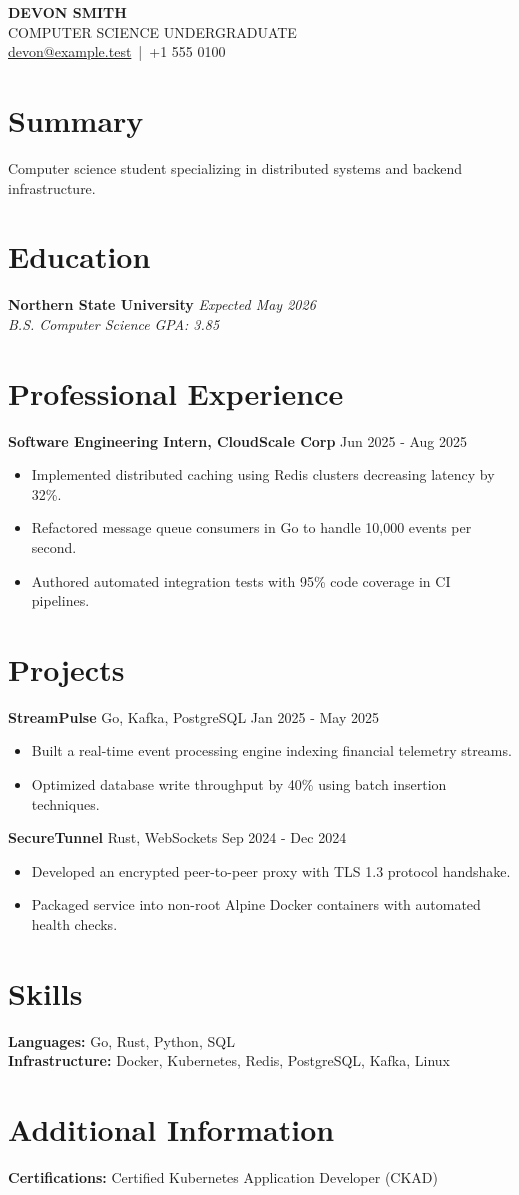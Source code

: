 \documentclass[10pt]{article}
\newcommand{\experienceitem}[4]{\textbf{#1} #2 #3 #4}
\newcommand{\projectitem}[4]{\textbf{#1} #2 #3 #4}
\begin{document}
\begin{center}
{\Large \textbf{DEVON SMITH}}\\
{\normalsize \textcolor{mediumgray}{COMPUTER SCIENCE UNDERGRADUATE}}\\
\href{mailto:devon@example.test}{devon@example.test} \,|\, +1 555 0100
\end{center}
\section{Summary}
Computer science student specializing in distributed systems and backend infrastructure.
\section{Education}
\noindent\textbf{Northern State University} \hfill \textit{Expected May 2026}\\
\textit{B.S. Computer Science} \hfill \textit{GPA: 3.85}
\section{Professional Experience}
\experienceitem{Software Engineering Intern, CloudScale Corp}{Jun 2025 - Aug 2025}{}{
\begin{itemize}[leftmargin=12pt]
  \item Implemented distributed caching using Redis clusters decreasing latency by 32\%.
  \item Refactored message queue consumers in Go to handle 10,000 events per second.
  \item Authored automated integration tests with 95\% code coverage in CI pipelines.
\end{itemize}}
\section{Projects}
\projectitem{StreamPulse}{Go, Kafka, PostgreSQL}{Jan 2025 - May 2025}{
\begin{itemize}[leftmargin=12pt]
  \item Built a real-time event processing engine indexing financial telemetry streams.
  \item Optimized database write throughput by 40\% using batch insertion techniques.
\end{itemize}}
\projectitem{SecureTunnel}{Rust, WebSockets}{Sep 2024 - Dec 2024}{
\begin{itemize}[leftmargin=12pt]
  \item Developed an encrypted peer-to-peer proxy with TLS 1.3 protocol handshake.
  \item Packaged service into non-root Alpine Docker containers with automated health checks.
\end{itemize}}
\section{Skills}
\noindent\textbf{Languages:} Go, Rust, Python, SQL\\
\textbf{Infrastructure:} Docker, Kubernetes, Redis, PostgreSQL, Kafka, Linux
\section{Additional Information}
\noindent\textbf{Certifications:} Certified Kubernetes Application Developer (CKAD)
\end{document}
